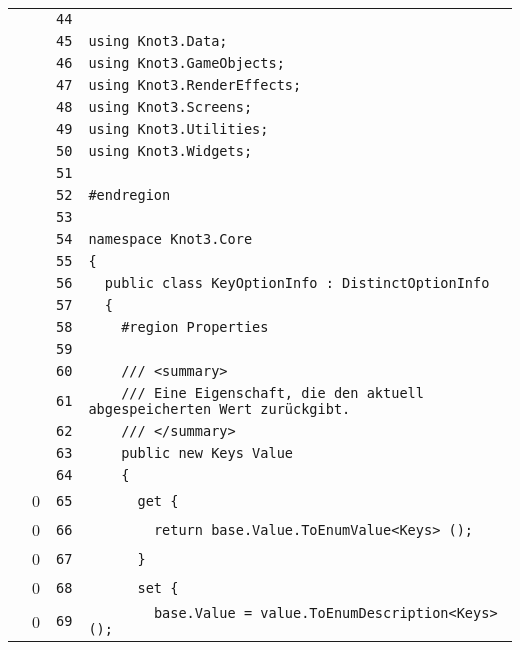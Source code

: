 \documentclass[a4paper,10pt]{article}
\begin{document}
\begin{longtable}[l]{lrrl}
\cellcolor{gray} &  & \verb~44~ & \verb~~\\
\cellcolor{gray} &  & \verb~45~ & \verb~using Knot3.Data;~\\
\cellcolor{gray} &  & \verb~46~ & \verb~using Knot3.GameObjects;~\\
\cellcolor{gray} &  & \verb~47~ & \verb~using Knot3.RenderEffects;~\\
\cellcolor{gray} &  & \verb~48~ & \verb~using Knot3.Screens;~\\
\cellcolor{gray} &  & \verb~49~ & \verb~using Knot3.Utilities;~\\
\cellcolor{gray} &  & \verb~50~ & \verb~using Knot3.Widgets;~\\
\cellcolor{gray} &  & \verb~51~ & \verb~~\\
\cellcolor{gray} &  & \verb~52~ & \verb~#endregion~\\
\cellcolor{gray} &  & \verb~53~ & \verb~~\\
\cellcolor{gray} &  & \verb~54~ & \verb~namespace Knot3.Core~\\
\cellcolor{gray} &  & \verb~55~ & \verb~{~\\
\cellcolor{gray} &  & \verb~56~ & \verb~  public class KeyOptionInfo : DistinctOptionInfo~\\
\cellcolor{gray} &  & \verb~57~ & \verb~  {~\\
\cellcolor{gray} &  & \verb~58~ & \verb~    #region Properties~\\
\cellcolor{gray} &  & \verb~59~ & \verb~~\\
\cellcolor{gray} &  & \verb~60~ & \verb~    /// <summary>~\\
\cellcolor{gray} &  & \verb~61~ & \verb~    /// Eine Eigenschaft, die den aktuell abgespeicherten Wert zurückgibt.~\\
\cellcolor{gray} &  & \verb~62~ & \verb~    /// </summary>~\\
\cellcolor{gray} &  & \verb~63~ & \verb~    public new Keys Value~\\
\cellcolor{gray} &  & \verb~64~ & \verb~    {~\\
\cellcolor{red} & 0 & \verb~65~ & \verb~      get {~\\
\cellcolor{red} & 0 & \verb~66~ & \verb~        return base.Value.ToEnumValue<Keys> ();~\\
\cellcolor{red} & 0 & \verb~67~ & \verb~      }~\\
\cellcolor{red} & 0 & \verb~68~ & \verb~      set {~\\
\cellcolor{red} & 0 & \verb~69~ & \verb~        base.Value = value.ToEnumDescription<Keys> ();~\\

\end{longtable}
\end{document}
